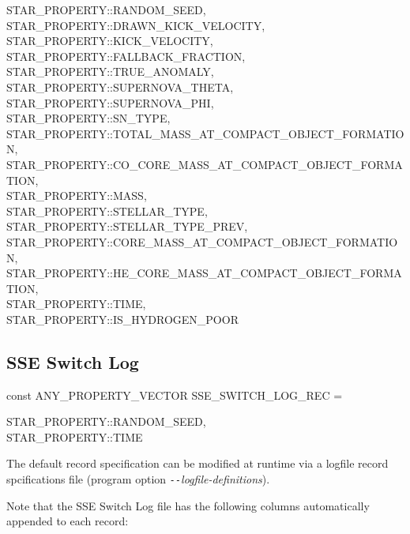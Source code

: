 \hfill
\begin{minipage}{\dimexpr\textwidth-2em}
    STAR\_PROPERTY::RANDOM\_SEED, \\
    STAR\_PROPERTY::DRAWN\_KICK\_VELOCITY, \\
    STAR\_PROPERTY::KICK\_VELOCITY, \\
    STAR\_PROPERTY::FALLBACK\_FRACTION, \\
    STAR\_PROPERTY::TRUE\_ANOMALY, \\				
    STAR\_PROPERTY::SUPERNOVA\_THETA, \\
    STAR\_PROPERTY::SUPERNOVA\_PHI, \\
    STAR\_PROPERTY::SN\_TYPE, \\
    STAR\_PROPERTY::TOTAL\_MASS\_AT\_COMPACT\_OBJECT\_FORMATION, \\
    STAR\_PROPERTY::CO\_CORE\_MASS\_AT\_COMPACT\_OBJECT\_FORMATION, \\
    STAR\_PROPERTY::MASS, \\
    STAR\_PROPERTY::STELLAR\_TYPE, \\
    STAR\_PROPERTY::STELLAR\_TYPE\_PREV, \\
    STAR\_PROPERTY::CORE\_MASS\_AT\_COMPACT\_OBJECT\_FORMATION, \\
    STAR\_PROPERTY::HE\_CORE\_MASS\_AT\_COMPACT\_OBJECT\_FORMATION, \\
    STAR\_PROPERTY::TIME, \\
    STAR\_PROPERTY::IS\_HYDROGEN\_POOR
\end{minipage}
\par\rcb{;}

\newpage
\subsection{SSE Switch Log}\label{sec:SSESwitchLog}

const ANY\_PROPERTY\_VECTOR SSE\_SWITCH\_LOG\_REC = \lcb

\hfill
\begin{minipage}{\dimexpr\textwidth-2em}
    STAR\_PROPERTY::RANDOM\_SEED, \\
    STAR\_PROPERTY::TIME
\end{minipage}
\par\rcb{;}

\bigskip
The default record specification can be modified at runtime via a logfile record spcifications file (program option \textit{\texttt{-{}-}logfile-definitions}).

Note that the SSE Switch Log file has the following columns automatically appended to each record:

